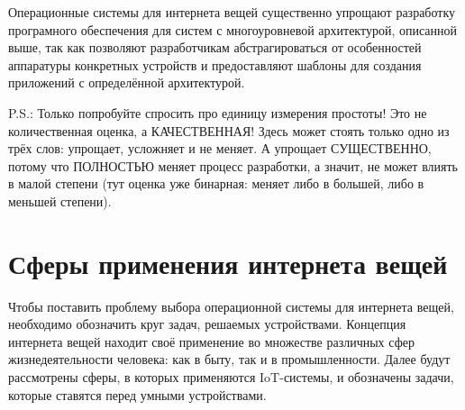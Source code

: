 Операционные системы для интернета вещей существенно упрощают разработку програмного обеспечения для систем с многоуровневой архитектурой, описанной выше, так как позволяют разработчикам абстрагироваться от особенностей аппаратуры конкретных устройств и предоставляют шаблоны для создания приложений с определённой архитектурой.

P.S.: Только попробуйте спросить про единицу измерения простоты! Это не количественная оценка, а КАЧЕСТВЕННАЯ! Здесь может стоять только одно из трёх слов: упрощает, усложняет и не меняет. А упрощает СУЩЕСТВЕННО, потому что ПОЛНОСТЬЮ меняет процесс разработки, а значит, не может влиять в малой степени (тут оценка уже бинарная: меняет либо в большей, либо в меньшей степени).








\section{Сферы применения интернета вещей}

Чтобы поставить проблему выбора операционной системы для интернета вещей, необходимо обозначить круг задач, решаемых устройствами. Концепция интернета вещей находит своё применение во множестве различных сфер жизнедеятельности человека: как в быту, так и в промышленности. Далее будут рассмотрены сферы, в которых применяются IoT-системы, и обозначены задачи, которые ставятся перед умными устройствами.

